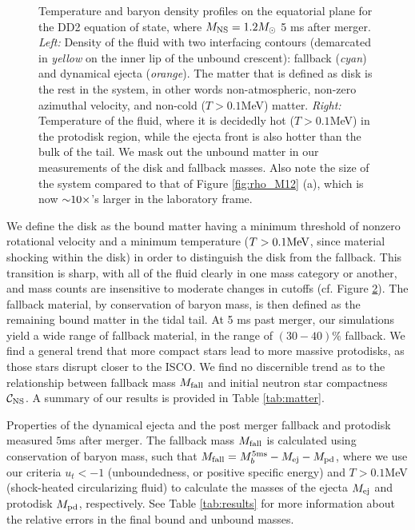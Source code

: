 \begin{figure}
\begin{subfigure}[b]{0.475\textwidth}
		\label{fig:temp_M12_DD2_5ms}
		\centering
	\end{subfigure}
	\caption[Temperature and density profiles on equatorial plane for DD2 $1.2 M_\odot$ model]{
		Temperature and baryon density profiles on the equatorial plane for the DD2 equation of state, where $M_{\rm NS} = 1.2 M_{\odot}$ 5 ms after merger.
		\textit{Left:} Density of the fluid with two interfacing contours (demarcated in \textit{yellow} on the inner lip of the unbound crescent): fallback (\textit{cyan}) and dynamical ejecta (\textit{orange}).  The matter that is defined as disk is the rest in the system, in other words non-atmospheric, non-zero azimuthal velocity, and non-cold ($T > 0.1$MeV) matter.
		\textit{Right:} Temperature of the fluid, where it is decidedly hot ($T>0.1$MeV) in the protodisk region, while the ejecta front is also hotter than the bulk of the tail.  We mask out the unbound matter in our measurements of the disk and fallback masses.  Also note the size of the system compared to that of Figure \ref{fig:rho_M12} (a), which is now $\mathord{\sim} 10 \times$'s larger in the laboratory frame.
	}
	\label{fig:dd2_m12_5ms}
\end{figure}

We define the disk as the bound matter having a minimum threshold of nonzero rotational velocity and a minimum temperature ($T>0.1 {\rm MeV}$, since material shocking within the disk) in order to distinguish the disk from the fallback.
This transition is sharp, with all of the fluid clearly in one mass category or another, and mass counts are insensitive to moderate changes in cutoffs (cf. Figure \ref{fig:dd2_m12_5ms}).
The fallback material, by conservation of baryon mass, is then defined as the  remaining bound matter in the tidal tail.
At 5 ms past merger, our simulations yield a wide range of fallback material, in the range of $(30 - 40)\%$ fallback.
We find a general trend that more compact stars lead to more massive protodisks, as those stars disrupt closer to the ISCO.
We find no discernible trend as to the relationship between fallback mass $M_{\rm fall}$ and initial neutron star compactness $\mathcal{C}_{\rm NS}$.
A summary of our results is provided in Table \ref{tab:matter}.

\begin{table}
	\begin{center}
		\caption[Baryon mass bookkeeping]{
			Properties of the dynamical ejecta and the post merger fallback and protodisk measured $5$ms after merger.  The fallback mass $M_{\rm fall}$ is calculated using conservation of baryon mass, such that $M_{\rm fall} = M_b^{5 {\rm ms}} - M_{\rm ej} -M_{\rm pd}$, where we use our criteria $u_t < -1$ (unboundedness, or positive specific energy) and $T > 0.1$MeV (shock-heated circularizing fluid) to calculate the masses of the ejecta $M_{\rm ej}$ and protodisk $M_{\rm pd}$, respectively.  See Table \ref{tab:results} for more information about the relative errors in the final bound and unbound masses.
		}
		\label{tab:matter}
		{
			
		}
	\end{center}
\end{table}


